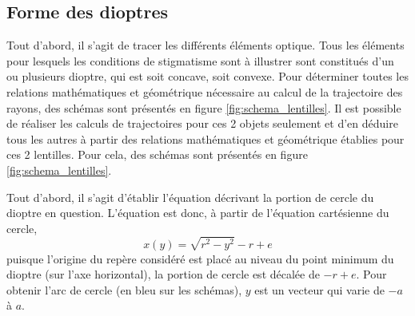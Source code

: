 \documentclass[a4paper, 11pt]{article}
\begin{document}
\subsection{Forme des dioptres}
Tout d'abord, il s'agit de tracer les différents éléments optique. Tous les éléments pour lesquels les conditions de stigmatisme sont à illustrer sont constitués d'un ou plusieurs dioptre, qui est soit concave, soit convexe. Pour déterminer toutes les relations mathématiques et géométrique nécessaire au calcul de la trajectoire des rayons, des schémas sont présentés en figure \ref{fig:schema_lentilles}. Il est possible de réaliser les calculs de trajectoires pour ces 2 objets seulement et d'en déduire tous les autres à partir des relations mathématiques et géométrique établies pour ces 2 lentilles. Pour cela, des schémas sont présentés en figure \ref{fig:schema_lentilles}.

Tout d'abord, il s'agit d'établir l'équation décrivant la portion de cercle du dioptre en question. L'équation est donc, à partir de l'équation cartésienne du cercle,
\begin{equation}
	x(y) = \sqrt{r^2 - y^2} - r + e
\end{equation}
puisque l'origine du repère considéré est placé au niveau du point minimum du dioptre (sur l'axe horizontal), la portion de cercle est décalée de $-r+e$. Pour obtenir l'arc de cercle (en bleu sur les schémas), $y$ est un vecteur qui varie de $-a$ à $a$.
\end{document}
